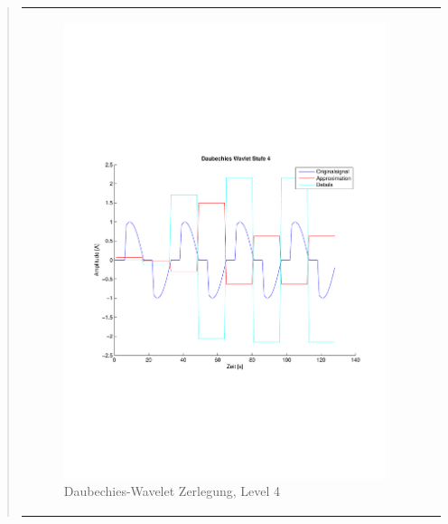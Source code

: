 \begin{quote}
\begin{center}
\begin{tabular}{ll}
\begin{minipage}{0.6\textwidth}
                    \end{minipage}
                    \begin{minipage}{0.6\textwidth}
    
                        \begin{figure}[H]
                            \label{fig:}
                            \includegraphics[scale=0.4, trim = 2cm 6cm 1cm
                            7.5cm,
                            clip]{./Bilder/Termin8/Daubechies_Wavlet_lvl_4}
                            \caption{Daubechies-Wavelet Zerlegung, Level 4}
                        \end{figure}
                    \vspace{-1.5em}
    
                    \end{minipage}
    

\end{tabular}
\end{center}
\end{quote}
